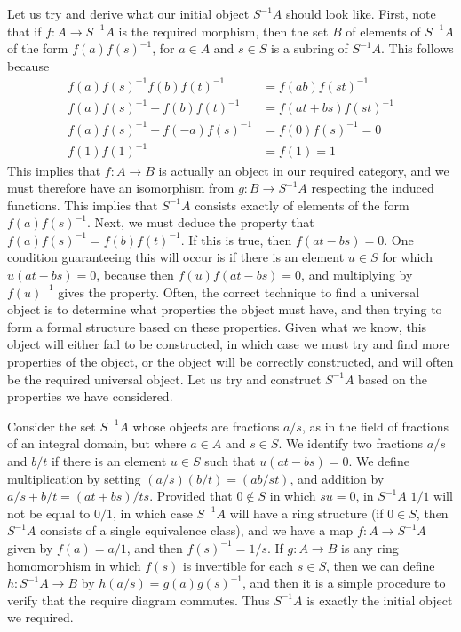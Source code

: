 Let us try and derive what our initial object $S^{-1}A$ should look like. First, note that if $f: A \to S^{-1}A$ is the required morphism, then the set $B$ of elements of $S^{-1}A$ of the form $f(a)f(s)^{-1}$, for $a \in A$ and $s \in S$ is a subring of $S^{-1}A$. This follows because
%
\begin{align*}
    f(a)f(s)^{-1}f(b)f(t)^{-1} &= f(ab) f(st)^{-1}\\
    f(a)f(s)^{-1} + f(b)f(t)^{-1} &= f(at + bs)f(st)^{-1}\\
    f(a)f(s)^{-1} + f(-a)f(s)^{-1} &= f(0)f(s)^{-1} = 0\\
    f(1)f(1)^{-1} &= f(1) = 1
\end{align*}
%
This implies that $f: A \to B$ is actually an object in our required category, and we must therefore have an isomorphism from $g: B \to S^{-1}A$ respecting the induced functions. This implies that $S^{-1}A$ consists exactly of elements of the form $f(a)f(s)^{-1}$. Next, we must deduce the property that $f(a)f(s)^{-1} = f(b)f(t)^{-1}$. If this is true, then $f(at - bs) = 0$. One condition guaranteeing this will occur is if there is an element $u \in S$ for which $u(at - bs) = 0$, because then $f(u)f(at - bs) = 0$, and multiplying by $f(u)^{-1}$ gives the property. Often, the correct technique to find a universal object is to determine what properties the object must have, and then trying to form a formal structure based on these properties. Given what we know, this object will either fail to be constructed, in which case we must try and find more properties of the object, or the object will be correctly constructed, and will often be the required universal object. Let us try and construct $S^{-1}A$ based on the properties we have considered.

Consider the set $S^{-1}A$ whose objects are fractions $a/s$, as in the field of fractions of an integral domain, but where $a \in A$ and $s \in S$. We identify two fractions $a/s$ and $b/t$ if there is an element $u \in S$ such that $u(at - bs) = 0$. We define multiplication by setting $(a/s)(b/t) = (ab/st)$, and addition by $a/s + b/t = (at + bs)/ts$. Provided that $0 \not \in S$ in which $su = 0$, in $S^{-1}A$ $1/1$ will not be equal to $0/1$, in which case $S^{-1}A$ will have a ring structure (if $0 \in S$, then $S^{-1}A$ consists of a single equivalence class), and we have a map $f: A \to S^{-1}A$ given by $f(a) = a/1$, and then $f(s)^{-1} = 1/s$. If $g: A \to B$ is any ring homomorphism in which $f(s)$ is invertible for each $s \in S$, then we can define $h: S^{-1}A \to B$ by $h(a/s) = g(a)g(s)^{-1}$, and then it is a simple procedure to verify that the require diagram commutes. Thus $S^{-1}A$ is exactly the initial object we required.

